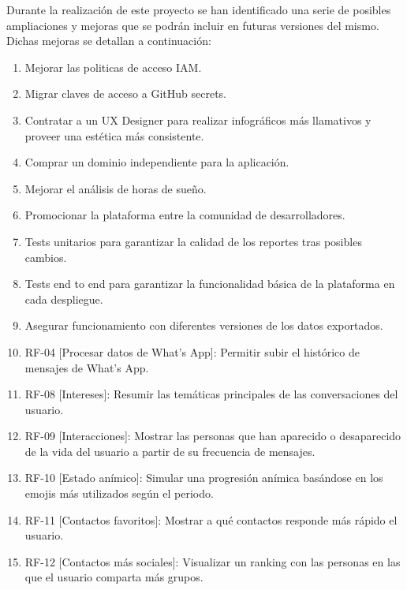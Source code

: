 
Durante la realización de este proyecto se han identificado una serie de posibles ampliaciones y mejoras que se podrán incluir en futuras versiones del mismo. Dichas mejoras se detallan a continuación:

\begin{enumerate}
    \item Mejorar las politicas de acceso IAM.
    \item Migrar claves de acceso a GitHub secrets.
    \item Contratar a un UX Designer para realizar infográficos más llamativos y proveer una estética más consistente.
    \item Comprar un dominio independiente para la aplicación.
    \item Mejorar el análisis de horas de sueño.
    \item Promocionar la plataforma entre la comunidad de desarrolladores.
    \item Tests unitarios para garantizar la calidad de los reportes tras posibles cambios.
    \item Tests end to end para garantizar la funcionalidad básica de la plataforma en cada despliegue.
    \item Asegurar funcionamiento con diferentes versiones de los datos exportados.
    \item RF-04 [Procesar datos de What's App]: Permitir subir el histórico de mensajes de What's App.
    \item RF-08 [Intereses]: Resumir las temáticas principales de las conversaciones del usuario.
    \item RF-09 [Interacciones]: Mostrar las personas que han aparecido o desaparecido de la vida del usuario a partir de su frecuencia de mensajes.
    \item RF-10 [Estado anímico]: Simular una progresión anímica basándose en los emojis más utilizados según el periodo.
    \item RF-11 [Contactos favoritos]: Mostrar a qué contactos responde más rápido el usuario.
    \item RF-12 [Contactos más sociales]: Visualizar un ranking con las personas en las que el usuario comparta más grupos.
\end{enumerate}
